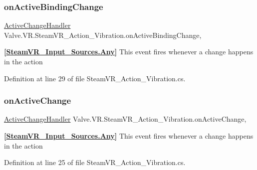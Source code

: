 \subsubsection{\texorpdfstring{onActiveBindingChange}{onActiveBindingChange}}
{\footnotesize\ttfamily \mbox{\hyperlink{class_valve_1_1_v_r_1_1_steam_v_r___action___vibration_a7706b3c9b71de3bea16a3fab8a882f0b}{Active\+Change\+Handler}} Valve.\+V\+R.\+Steam\+V\+R\+\_\+\+Action\+\_\+\+Vibration.\+on\+Active\+Binding\+Change\hspace{0.3cm}{\ttfamily [add]}, {\ttfamily [remove]}}



{\bfseries{\mbox{[}\mbox{\hyperlink{namespace_valve_1_1_v_r_a82e5bf501cc3aa155444ee3f0662853faed36a1ef76a59ee3f15180e0441188ad}{Steam\+V\+R\+\_\+\+Input\+\_\+\+Sources.\+Any}}\mbox{]}}} This event fires whenever a change happens in the action 



Definition at line 29 of file Steam\+V\+R\+\_\+\+Action\+\_\+\+Vibration.\+cs.

\mbox{\label{class_valve_1_1_v_r_1_1_steam_v_r___action___vibration_a7e76205f9a2f175a2b5a6ad240e1b70a}} 
\subsubsection{\texorpdfstring{onActiveChange}{onActiveChange}}
{\footnotesize\ttfamily \mbox{\hyperlink{class_valve_1_1_v_r_1_1_steam_v_r___action___vibration_a7706b3c9b71de3bea16a3fab8a882f0b}{Active\+Change\+Handler}} Valve.\+V\+R.\+Steam\+V\+R\+\_\+\+Action\+\_\+\+Vibration.\+on\+Active\+Change\hspace{0.3cm}{\ttfamily [add]}, {\ttfamily [remove]}}



{\bfseries{\mbox{[}\mbox{\hyperlink{namespace_valve_1_1_v_r_a82e5bf501cc3aa155444ee3f0662853faed36a1ef76a59ee3f15180e0441188ad}{Steam\+V\+R\+\_\+\+Input\+\_\+\+Sources.\+Any}}\mbox{]}}} This event fires whenever a change happens in the action 



Definition at line 25 of file Steam\+V\+R\+\_\+\+Action\+\_\+\+Vibration.\+cs.

